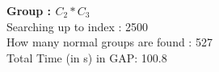 \textbf{Group : $C_2*C_3$}\\
Searching up to index : 2500\\
How many normal groups are found : 527\\
Total Time (in s) in GAP: 100.8\\
